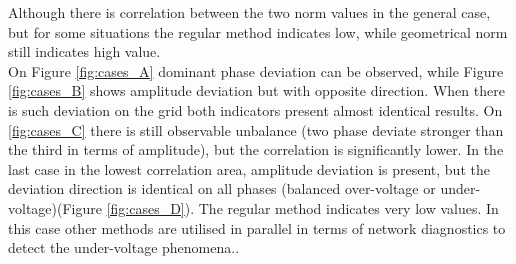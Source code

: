             Although there is correlation between the two norm values in the general case, but for some situations the regular method indicates low, while geometrical norm still indicates high value.\\
            On Figure \ref{fig:cases_A} dominant phase deviation can be observed, while Figure \ref{fig:cases_B} shows amplitude deviation but with opposite direction. When there is such deviation on the grid both indicators present almost identical results. On \ref{fig:cases_C} there is still observable unbalance (two phase deviate stronger than the third in terms of amplitude), but the correlation is significantly lower. In the last case in the lowest correlation area, amplitude deviation is present, but the deviation direction is identical on all phases (balanced over-voltage or under-voltage)(Figure \ref{fig:cases_D}). The regular method indicates very low values. In this case other methods are utilised in parallel in terms of network diagnostics to detect the under-voltage phenomena.\cite{arn1997under-voltage}.


